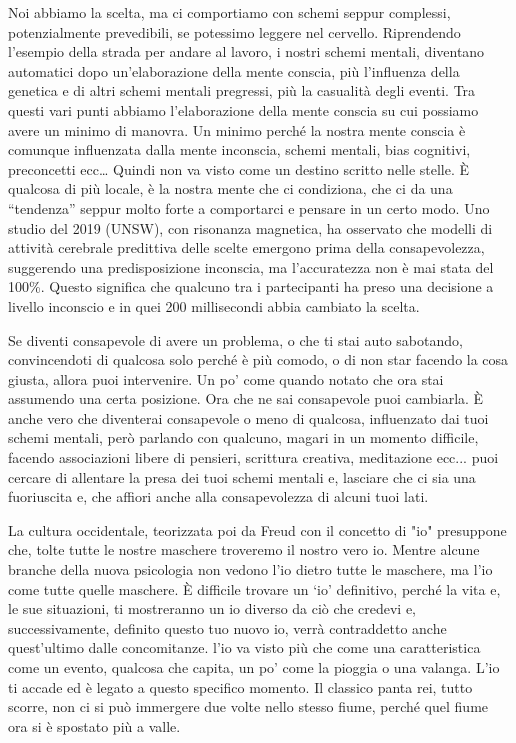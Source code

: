 \documentclass[12pt]{book} %
\begin{document}
Noi abbiamo la scelta, ma ci comportiamo con schemi seppur complessi, potenzialmente prevedibili, se potessimo leggere
nel cervello. Riprendendo l'esempio della strada per andare al lavoro, i nostri schemi mentali,
diventano automatici dopo un'elaborazione della mente conscia, più
l'influenza della genetica e di altri schemi mentali pregressi, più la casualità degli eventi. Tra questi vari punti abbiamo l'elaborazione della mente conscia su cui possiamo avere un minimo di
manovra. Un minimo perché la nostra mente conscia è comunque influenzata dalla mente inconscia, schemi mentali, bias
cognitivi, preconcetti ecc… Quindi non va visto come un destino scritto nelle stelle. È qualcosa di più locale, è la
nostra mente che ci condiziona, che ci da una “tendenza” seppur molto forte a comportarci e pensare in un certo modo.
Uno studio del 2019 (UNSW), con risonanza magnetica, ha osservato che modelli di attività cerebrale predittiva delle scelte emergono prima della consapevolezza, suggerendo una predisposizione inconscia, ma l’accuratezza non è mai stata del 100\%.
Questo significa che qualcuno tra i partecipanti ha preso
una decisione a livello inconscio e in quei 200 millisecondi abbia cambiato la
scelta.

Se diventi consapevole di avere un problema, o che ti stai auto sabotando,
convincendoti di qualcosa solo perché è più comodo, o di non star facendo la cosa giusta, allora puoi intervenire.
Un po' come quando notato che ora stai assumendo una certa posizione. Ora che ne sai consapevole puoi
cambiarla. È anche vero che diventerai consapevole o meno di qualcosa, influenzato dai tuoi schemi mentali,
però parlando con qualcuno, magari in un momento difficile, facendo associazioni libere di pensieri, scrittura
creativa, meditazione ecc... puoi cercare di allentare la presa dei tuoi schemi mentali e,
lasciare che ci sia una fuoriuscita e, che affiori anche alla consapevolezza di alcuni tuoi lati.

La cultura occidentale, teorizzata poi da Freud con il concetto di "io" presuppone che,
tolte tutte le nostre maschere troveremo il nostro vero io. Mentre alcune branche della nuova psicologia non vedono
l'io dietro tutte le maschere, ma l'io come tutte quelle maschere. È difficile trovare un ‘io’ definitivo, perché la vita e, le sue
situazioni, ti mostreranno un io diverso da ciò che credevi e, successivamente, definito questo tuo nuovo io, verrà
contraddetto anche quest'ultimo dalle concomitanze. l'io va visto più che come una caratteristica come un
evento, qualcosa che capita, un po' come la pioggia o una valanga. L'io ti accade ed è legato a questo specifico
momento. Il classico panta rei, tutto scorre, non ci si può immergere due volte nello stesso fiume, perché quel fiume
ora si è spostato più a valle.
\end{document}
